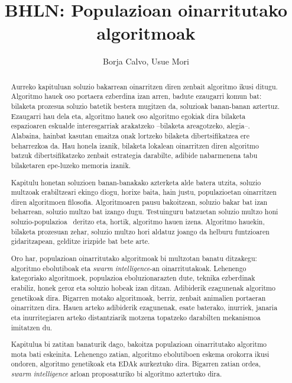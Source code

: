 \documentclass[eu]{ifirak}\usepackage[]{graphicx}\usepackage[]{color}
\newcommand{\zkk}{\guillemotleft}
\newcommand{\skk}{\guillemotright}
\newcommand{\eng}[1]{\textit{#1}}
\newcommand{\hgl}[1]{\zkk #1\skk\ }
\begin{document}
\title{BHLN: Populazioan oinarritutako algoritmoak}
\date{}
\author{Borja Calvo, Usue Mori}






\maketitle

\begin{abstract}
Aurreko kapituluan soluzio bakarrean oinarritzen diren zenbait algoritmo ikusi ditugu. Algoritmo hauek oso portaera ezberdina izan arren, badute ezaugarri komun bat: bilaketa prozesua soluzio batetik bestera mugitzen da, soluzioak banan-banan aztertuz. Ezaugarri hau dela eta, algoritmo hauek oso algoritmo egokiak dira bilaketa espazioaren eskualde interesgarriak arakatzeko --bilaketa areagotzeko, alegia--. Alabaina, hainbat kasutan emaitza onak lortzeko bilaketa dibertsifikatzea ere beharrezkoa da. Hau honela izanik, bilaketa lokalean oinarritzen diren algoritmo batzuk dibertsifikatzeko zenbait estrategia darabilte, adibide nabarmenena tabu bilaketaren epe-luzeko memoria izanik.

Kapitulu honetan soluzioen banan-banakako azterketa alde batera utzita, soluzio multzoak erabiltzeari ekingo diogu, horixe baita, hain justu, populazioetan oinarritzen diren algoritmoen filosofia. Algoritmoaren pausu bakoitzean, soluzio bakar bat izan beharrean, soluzio multzo bat izango dugu. Testuinguru batzuetan soluzio multzo honi \hgl{soluzio-populazioa} deritzo eta, hortik, algoritmo hauen izena. Algoritmo hauekin, bilaketa prozesuan zehar, soluzio multzo hori aldatuz joango da helburu funtzioaren gidaritzapean, gelditze irizpide bat bete arte.

Oro har, populazioan oinarritutako algoritmoak bi multzotan banatu ditzakegu: algoritmo ebolutiboak eta \eng{swarm intelligence}-an oinarritutakoak. Lehenengo kategoriako algoritmoek, populazioa eboluzionarazten dute, teknika ezberdinak erabiliz, honek geroz eta soluzio hobeak izan ditzan. Adibiderik ezagunenak algoritmo genetikoak dira. Bigarren motako algoritmoak, berriz, zenbait animalien portaeran oinarritzen dira. Hauen arteko adibiderik ezagunenak, esate baterako, inurriek, janaria eta inurritegiaren arteko distantziarik motzena topatzeko darabilten mekanismoa imitatzen du.

Kapitulua bi zatitan banaturik dago, bakoitza populazioan oinarritutako algoritmo mota bati eskeinita. Lehenengo zatian, algoritmo ebolutiboen eskema orokorra ikusi ondoren, algoritmo genetikoak \cite{holland1975} eta EDAk \cite{larranaga2002,lozano2006} aurkeztuko dira. Bigarren zatian ordea, \eng{swarm intelligence} \cite{blum2008} arloan proposaturiko bi algoritmo aztertuko dira.
\end{abstract}
\end{document}
